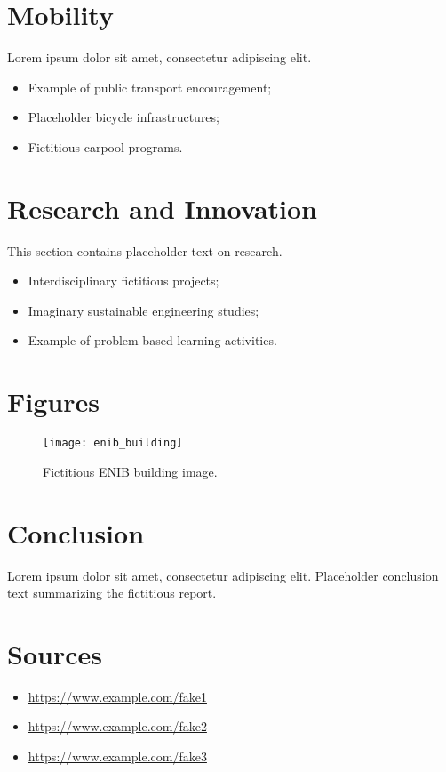 \documentclass[12pt]{article}
\begin{document}
\section{Mobility}
Lorem ipsum dolor sit amet, consectetur adipiscing elit.  
\begin{itemize}
    \item Example of public transport encouragement;
    \item Placeholder bicycle infrastructures;
    \item Fictitious carpool programs.
\end{itemize}

\section{Research and Innovation}
This section contains placeholder text on research.  
\begin{itemize}
    \item Interdisciplinary fictitious projects;
    \item Imaginary sustainable engineering studies;
    \item Example of problem-based learning activities.
\end{itemize}

\section{Figures}
\begin{figure}[h!]
    \centering
    \texttt{[image: enib\_building]}
    \caption{Fictitious ENIB building image.}
\end{figure}

\section{Conclusion}
Lorem ipsum dolor sit amet, consectetur adipiscing elit. Placeholder conclusion text summarizing the fictitious report.

\section{Sources}
\begin{itemize}
    \item \url{https://www.example.com/fake1}
    \item \url{https://www.example.com/fake2}
    \item \url{https://www.example.com/fake3}
\end{itemize}
\end{document}
